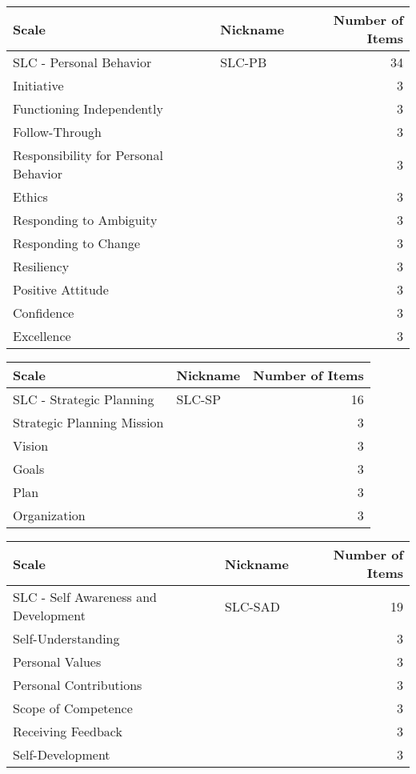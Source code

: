\documentclass[11pt]{article}
\begin{document}
\begin{center}
\begin{tabular}{llr}
Scale & Nickname & Number of Items\\
\hline
SLC - Personal Behavior & SLC-PB & 34\\
\hline
Initiative &  & 3\\
Functioning Independently &  & 3\\
Follow-Through &  & 3\\
Responsibility for Personal Behavior &  & 3\\
Ethics &  & 3\\
Responding to Ambiguity &  & 3\\
Responding to Change &  & 3\\
Resiliency &  & 3\\
Positive Attitude &  & 3\\
Confidence &  & 3\\
Excellence &  & 3\\
\end{tabular}
\end{center}

\begin{center}
\begin{tabular}{llr}
Scale & Nickname & Number of Items\\
\hline
SLC - Strategic Planning & SLC-SP & 16\\
\hline
Strategic Planning Mission &  & 3\\
Vision &  & 3\\
Goals &  & 3\\
Plan &  & 3\\
Organization &  & 3\\
\end{tabular}
\end{center}

\begin{center}
\begin{tabular}{llr}
Scale & Nickname & Number of Items\\
\hline
SLC - Self Awareness and Development & SLC-SAD & 19\\
\hline
Self-Understanding &  & 3\\
Personal Values &  & 3\\
Personal Contributions &  & 3\\
Scope of Competence &  & 3\\
Receiving Feedback &  & 3\\
Self-Development &  & 3\\
\end{tabular}
\end{center}
\end{document}
